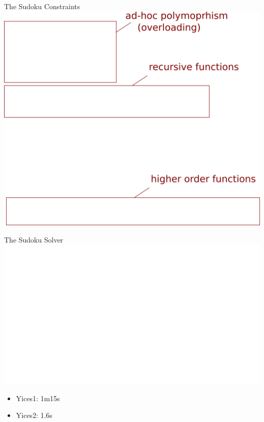 \documentclass{beamer}
\begin{document}
\begin{frame}{The Sudoku Constraints}
\includegraphics[width=\textwidth]{isvalid}
\end{frame}

\begin{frame}{The Sudoku Solver}
\includegraphics[width=\textwidth]{main}
\begin{itemize}
\item Yices1: 1m15s
\item Yices2: 1.6s
\end{itemize}
\end{frame}
\end{document}
